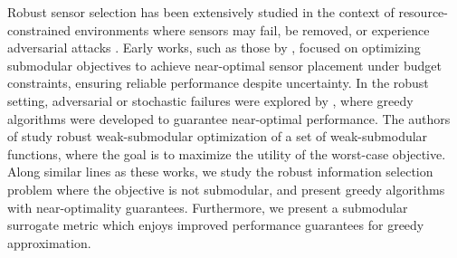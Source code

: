 Robust sensor selection has been extensively studied in the context of resource-constrained environments where sensors may fail, be removed, or experience adversarial attacks \cite{ye2020complexity,laszka2015resilient,oh2023dynamic}. Early works, such as those by \cite{krause2008robust,kaya2025randomized,laszka2015resilient}, focused on optimizing submodular objectives to achieve near-optimal sensor placement under budget constraints, ensuring reliable performance despite uncertainty. In the robust setting, adversarial or stochastic failures were explored by \cite{tzoumas2018resilient}, where greedy algorithms were developed to guarantee near-optimal performance. The authors of \cite{kaya2025randomized} study robust weak-submodular optimization of a set of weak-submodular functions, where the goal is to maximize the utility of the worst-case objective. Along similar lines as these works, we study the robust information selection problem where the objective is not submodular, and present greedy algorithms with near-optimality guarantees. Furthermore, we present a submodular surrogate metric which enjoys improved performance guarantees for greedy approximation.
\newpage
